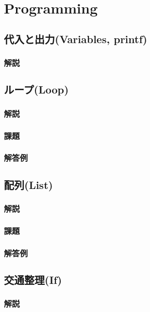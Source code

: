\documentclass[10pt,a4j]{jbook}
\begin{document}
\chapter{Programming}
\section{代入と出力(Variables, printf)}
\subsection{解説}
 

\pagebreak
\section{ループ(Loop)}

\subsection{解説}
 
\subsection{課題}
 
\subsection{解答例}
 


\pagebreak
\section{配列(List)}
\subsection{解説}
 
\subsection{課題}
 
\subsection{解答例}
 

\pagebreak
\section{交通整理(If)}
\subsection{解説}
 
\end{document}
